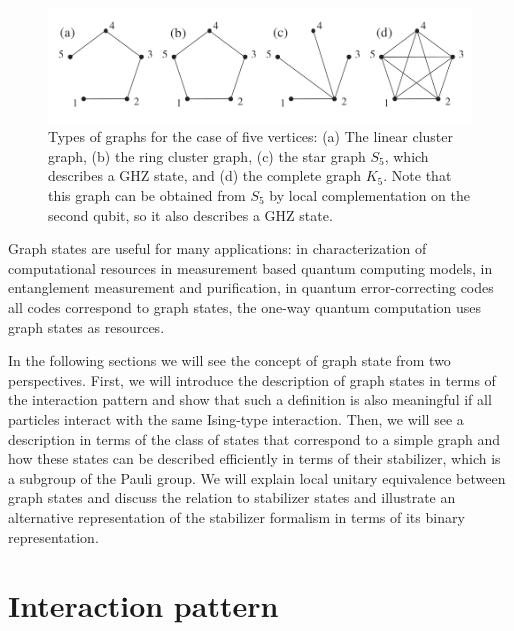 \documentclass[10pt,a4paper]{book}
\numberwithin{equation}{chapter}
\numberwithin{figure}{chapter}
\numberwithin{table}{chapter}
\begin{document}
\begin{figure}[H]
    \begin{center}
        \includegraphics[scale=0.4]{ImagenPentagono.png}
    \end{center}
    \caption{\footnotesize Types of graphs for the case of five vertices: (a) The linear cluster graph, (b) the ring cluster graph, (c) the star graph $S_5$, which describes a GHZ state, and (d) the
complete graph $K_5$. Note that this graph can be obtained from $S_5$ by local complementation on the second qubit, so it also describes a GHZ state.}
    \label{figPentagono}
\end{figure}

Graph states are useful for many applications: in characterization of computational resources in measurement based quantum computing models, in entanglement measurement and purification, in quantum error-correcting codes all codes correspond to graph states, the one-way quantum computation uses graph states as resources.

In the following sections we will see the concept of graph state from two perspectives. First, we will introduce the description of graph states in terms of the interaction pattern and show that such a definition is also meaningful if all particles interact with the same Ising-type interaction. Then, we will see a description in terms of the class of states that correspond to a simple graph and how these states can be described efficiently in terms of their stabilizer, which is a subgroup of the Pauli group. We will explain local unitary equivalence between graph states and discuss the relation to stabilizer states and illustrate an alternative representation of the stabilizer formalism in terms of its binary representation.

\section{Interaction pattern}
\end{document}
